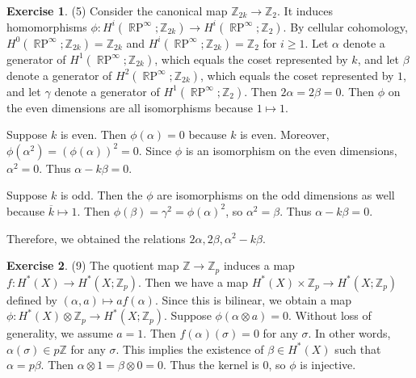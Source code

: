 \documentclass[12pt, psamsfonts]{amsart}
\theoremstyle{definition}
\newtheorem*{exer}{Exercise}
\theoremstyle{remark}
\DeclareMathOperator{\RP}{\mathbb{R}P}
\numberwithin{equation}{section}
\begin{document}
\begin{exer}{(5)}
  Consider the canonical map $\mathbb{Z}_{2k} \rightarrow \mathbb{Z}_2$.
  It induces homomorphisms $\phi: H^i(\RP^{\infty};\mathbb{Z}_{2k}) \rightarrow H^i(\RP^{\infty};\mathbb{Z}_{2})$.
  By cellular cohomology, $H^0(\RP^{\infty}; \mathbb{Z}_{2k}) = \mathbb{Z}_{2k}$ and $H^i(\RP^{\infty}; \mathbb{Z}_{2k}) = \mathbb{Z}_2$ for $i \geq 1$.
  Let $\alpha$ denote a generator of $H^1(\RP^{\infty};\mathbb{Z}_{2k})$, which equals the coset represented by $k$, and let $\beta$ denote a generator of $H^2(\RP^{\infty}; \mathbb{Z}_{2k})$, which equals the coset represented by $1$, and let $\gamma$ denote a generator of $H^1(\RP^{\infty}; \mathbb{Z}_2)$.
  Then $2\alpha = 2\beta = 0$.
  Then $\phi$ on the even dimensions are all isomorphisms because $1 \mapsto 1$.

  Suppose $k$ is even.
  Then $\phi(\alpha) = 0$ because $k$ is even.
  Moreover, $\phi(\alpha^2) = (\phi(\alpha))^2 = 0$.
  Since $\phi$ is an isomorphism on the even dimensions, $\alpha^2 = 0$.
  Thus $\alpha - k\beta = 0$.

  Suppose $k$ is odd.
  Then the $\phi$ are isomorphisms on the odd dimensions as well because $\overline{k} \mapsto 1$.
  Then $\phi(\beta) = \gamma^2 = \phi(\alpha)^2$, so $\alpha^2 = \beta$.
  Thus $\alpha - k\beta = 0$.

  Therefore, we obtained the relations $2\alpha, 2\beta, \alpha^2 - k\beta$.
\end{exer}

\begin{exer}{(9)}
  The quotient map $\mathbb{Z} \rightarrow \mathbb{Z}_p$ induces a map $f: H^{\ast}(X) \rightarrow H^{\ast}(X; \mathbb{Z}_p)$.
  Then we have a map $H^{\ast}(X) \times \mathbb{Z}_p \rightarrow H^{\ast}(X; \mathbb{Z}_p)$ defined by $(\alpha, a) \mapsto af(\alpha)$.
  Since this is bilinear, we obtain a map $\phi: H^{\ast}(X) \otimes \mathbb{Z}_p \rightarrow H^{\ast}(X; \mathbb{Z}_p)$.
  Suppose $\phi(\alpha \otimes a) = 0$.
  Without loss of generality, we assume $a = 1$.
  Then $f(\alpha)(\sigma) = 0$ for any $\sigma$.
  In other words, $\alpha(\sigma) \in p\mathbb{Z}$ for any $\sigma$.
  This implies the existence of $\beta \in H^{\ast}(X)$ such that $\alpha = p\beta$.
  Then $\alpha \otimes 1 = \beta \otimes 0 = 0$.
  Thus the kernel is 0, so $\phi$ is injective.

\end{exer}
\end{document}
